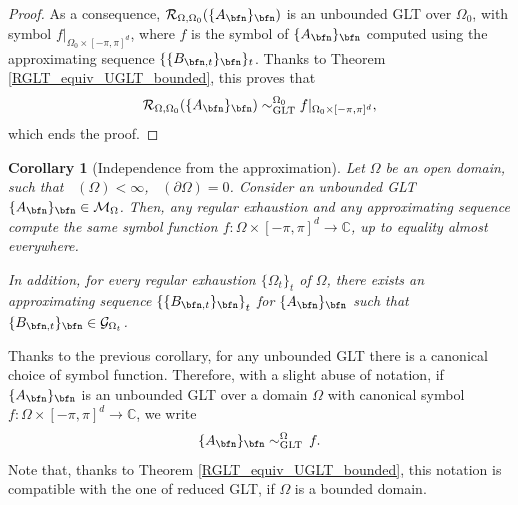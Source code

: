 \documentclass{amsart}
\newtheorem{cor}[thm]{Corollary}
\DeclareMathOperator{\Ld}{\mathcal{L}^d}
\begin{document}
\begin{proof}
    As a consequence, $\mathcal{R}_{\Omega,\Omega_0}(\{A_\bfn\}_\bfn)$ is an unbounded GLT over $\Omega_0$, with symbol $f|_{\Omega_0\times[-\pi,\pi]^d}$, where $f$ is the symbol of $\{A_\bfn\}_\bfn$ computed using the approximating sequence $\{\{B_{\bfn,t}\}_\bfn\}_t$. Thanks to Theorem \ref{RGLT_equiv_UGLT_bounded}, this proves that
    \begin{equation*}
        \mathcal{R}_{\Omega,\Omega_0}(\{A_\bfn\}_\bfn)\sim_{\mathrm{GLT}}^{\Omega_0}f|_{\Omega_0\times[-\pi,\pi]^d},
    \end{equation*}
    which ends the proof.
\end{proof}
\begin{cor}[Independence from the approximation]\label{indep_on_approx}
    Let $\Omega$ be an open domain, such that $\Ld(\Omega)<\infty$, $\Ld(\partial\Omega)=0$. Consider an unbounded GLT $\{A_\bfn\}_\bfn\in\mathcal{M}_\Omega$. Then, any regular exhaustion and any approximating sequence compute the same symbol function $f:\Omega\times[-\pi,\pi]^d\to\mathbb{C}$, up to equality almost everywhere.

    In addition, for every regular exhaustion $\{\Omega_t\}_t$ of $\Omega$, there exists an approximating sequence $\left\{\{B_{\bfn,t}\}_\bfn\right\}_t$ for $\{A_\bfn\}_\bfn$ such that $\{B_{\bfn,t}\}_\bfn\in\mathcal{G}_{\Omega_t}$.
\end{cor}
    Thanks to the previous corollary, for any unbounded GLT there is a canonical choice of symbol function. Therefore, with a slight abuse of notation, if $\{A_\bfn\}_\bfn$ is an unbounded GLT over a domain $\Omega$ with canonical symbol $f:\Omega\times[-\pi,\pi]^d\to\mathbb{C}$, we write 
     \begin{equation*}
        \{A_{\bfn}\}_{\bfn}\sim_{\mathrm{GLT}}^{\Omega}\,f.
    \end{equation*}
    Note that, thanks to Theorem \ref{RGLT_equiv_UGLT_bounded}, this notation is compatible with the one of reduced GLT, if $\Omega$ is a bounded domain.
\end{document}
